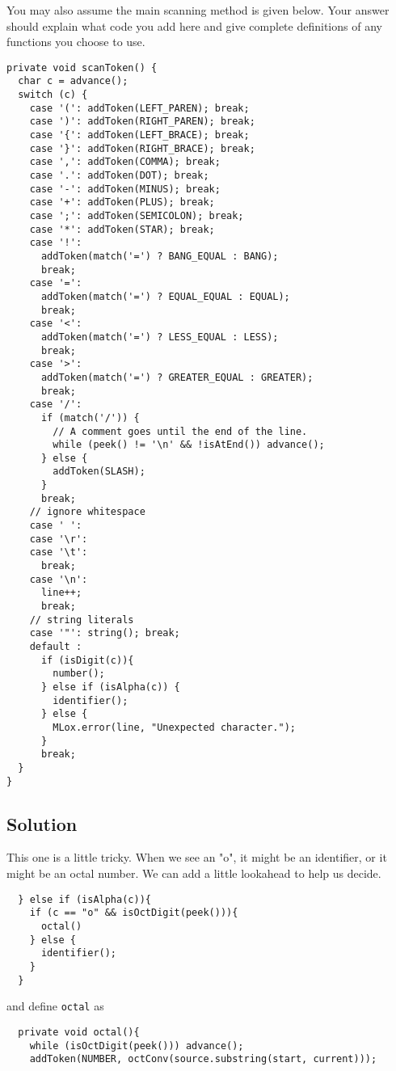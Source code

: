 \documentclass[twoside=false, DIV=14]{scrartcl}
\begin{document}
You may also assume the main scanning method is given below. Your answer should explain what code you add here and give complete definitions of any functions you choose to use.

\begin{lstlisting}
private void scanToken() {
  char c = advance();
  switch (c) {
    case '(': addToken(LEFT_PAREN); break;
    case ')': addToken(RIGHT_PAREN); break;
    case '{': addToken(LEFT_BRACE); break;
    case '}': addToken(RIGHT_BRACE); break;
    case ',': addToken(COMMA); break;
    case '.': addToken(DOT); break;
    case '-': addToken(MINUS); break;
    case '+': addToken(PLUS); break;
    case ';': addToken(SEMICOLON); break;
    case '*': addToken(STAR); break; 
    case '!':
      addToken(match('=') ? BANG_EQUAL : BANG);
      break;
    case '=':
      addToken(match('=') ? EQUAL_EQUAL : EQUAL);
      break;
    case '<':
      addToken(match('=') ? LESS_EQUAL : LESS);
      break;
    case '>':
      addToken(match('=') ? GREATER_EQUAL : GREATER);
      break;
    case '/':
      if (match('/')) {
        // A comment goes until the end of the line.
        while (peek() != '\n' && !isAtEnd()) advance();
      } else {
        addToken(SLASH);
      }
      break;
    // ignore whitespace
    case ' ':
    case '\r':
    case '\t':
      break;
    case '\n':
      line++;
      break;
    // string literals
    case '"': string(); break;
    default : 
      if (isDigit(c)){
        number();
      } else if (isAlpha(c)) {
        identifier();
      } else {
        MLox.error(line, "Unexpected character.");
      }
      break;
  }
}
\end{lstlisting}

\subsection*{Solution}

This one is a little tricky.  When we see an "o", it might be an identifier, or it might be an octal number.  We can add a little lookahead to help us decide.

\begin{lstlisting}
  } else if (isAlpha(c)){
    if (c == "o" && isOctDigit(peek())){
      octal()
    } else {
      identifier();
    }
  }   
\end{lstlisting}

and define \lstinline|octal| as

\begin{lstlisting}
  private void octal(){
    while (isOctDigit(peek())) advance();
    addToken(NUMBER, octConv(source.substring(start, current)));
\end{lstlisting}
\end{document}
